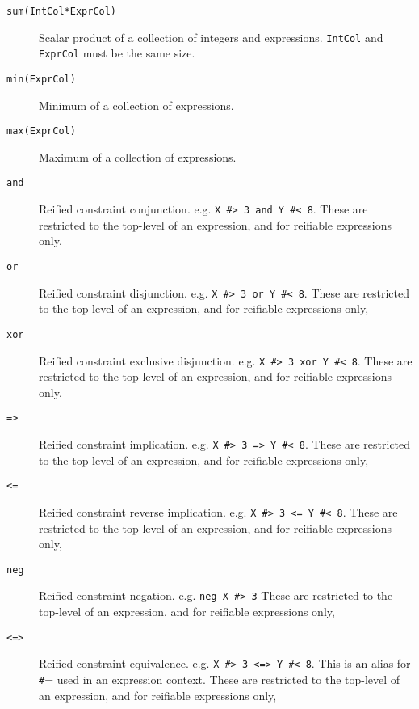 \begin{description}
\item[\texttt{sum(IntCol*ExprCol)}]
	    Scalar product of a collection of integers and expressions.
            \verb'IntCol' and \verb'ExprCol' must be the same size.

\item[\texttt{min(ExprCol)}]
	    Minimum of a collection of expressions.

\item[\texttt{max(ExprCol)}]
	    Maximum of a collection of expressions.

\item[\texttt{and}]
	    Reified constraint conjunction.  e.g. \verb'X #> 3 and Y #< 8'.
            These are restricted to the top-level of an expression,
            and for reifiable expressions only,

\item[\texttt{or}]
	    Reified constraint disjunction.  e.g. \verb'X #> 3 or Y #< 8'.
            These are restricted to the top-level of an expression,
            and for reifiable expressions only,

\item[\texttt{xor}]
	    Reified constraint exclusive disjunction.  e.g. \verb'X #> 3 xor Y #< 8'.
            These are restricted to the top-level of an expression,
            and for reifiable expressions only,

\item[\texttt{=>}]
	    Reified constraint implication.  e.g. \verb'X #> 3 => Y #< 8'.
            These are restricted to the top-level of an expression,
            and for reifiable expressions only,

\item[\texttt{<=}]
	    Reified constraint reverse implication. e.g. \verb'X #> 3 <= Y #< 8'.
            These are restricted to the top-level of an expression,
            and for reifiable expressions only,

\item[\texttt{neg}]
	    Reified constraint negation.  e.g. \verb'neg X #> 3'
            These are restricted to the top-level of an expression,
            and for reifiable expressions only,

\item[\texttt{<=>}]
	    Reified constraint equivalence.  e.g. \verb'X #> 3 <=> Y #< 8'.
            This is an alias for {\texttt \#=} used in an expression context.
            These are restricted to the top-level of an expression,
            and for reifiable expressions only,


\end{description}
